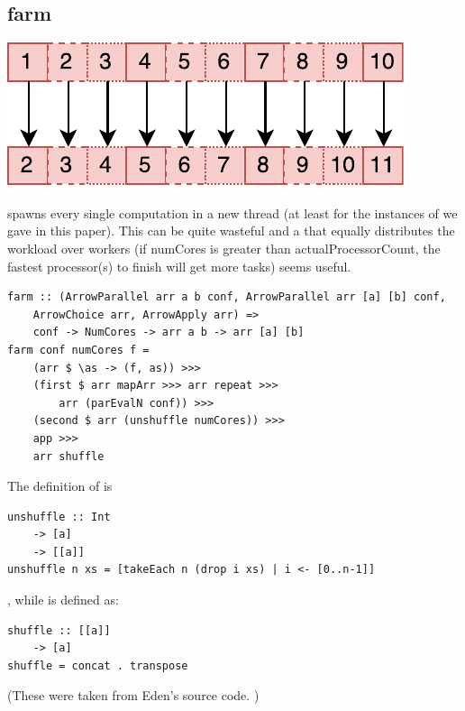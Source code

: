 \subsection{farm}
\begin{center}
	\includegraphics[scale=0.7]{images/farm}
\end{center}
 spawns every single computation in a new thread (at least for the instances of  we gave in this paper). This can be quite wasteful and a  that equally distributes the workload over  workers (if numCores is greater than actualProcessorCount, the fastest processor(s) to finish will get more tasks) seems useful.
\begin{lstlisting}[frame=htrbl]
farm :: (ArrowParallel arr a b conf, ArrowParallel arr [a] [b] conf,
	ArrowChoice arr, ArrowApply arr) =>
	conf -> NumCores -> arr a b -> arr [a] [b]
farm conf numCores f =
	(arr $ \as -> (f, as)) >>>
	(first $ arr mapArr >>> arr repeat >>>
		arr (parEvalN conf)) >>>
	(second $ arr (unshuffle numCores)) >>>
	app >>>
	arr shuffle
\end{lstlisting}
The definition of  is
\begin{lstlisting}[frame=htrbl]
unshuffle :: Int
	-> [a]
	-> [[a]]
unshuffle n xs = [takeEach n (drop i xs) | i <- [0..n-1]]
\end{lstlisting}
, while  is defined as:
\begin{lstlisting}[frame=htrbl]
shuffle :: [[a]]
	-> [a]
shuffle = concat . transpose
\end{lstlisting}
(These were taken from Eden's source code. \cite{eden_skel_shuffle})

